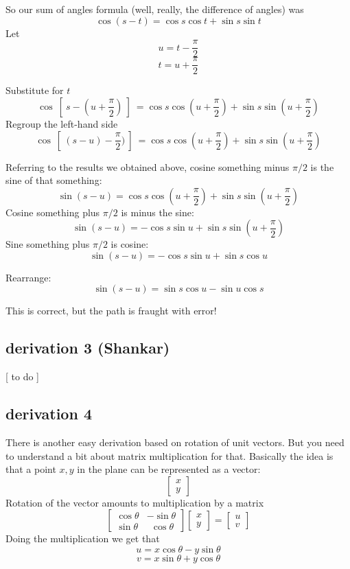 \documentclass[11pt, oneside]{article}
\begin{document}
So our sum of angles formula (well, really, the difference of angles) was
\[ \cos (s - t) = \cos s \cos t + \sin s \sin t \]
Let
\[ u = t - \frac{\pi}{2} \]
\[ t  = u + \frac{\pi}{2} \]

Substitute for $t$
\[ \cos \ [ \ s - (u + \frac{\pi}{2}) \ ] \ = \cos s \cos (u + \frac{\pi}{2}) + \sin s \sin (u + \frac{\pi}{2}) \]
Regroup the left-hand side
\[ \cos \ [ \ (s - u) - \frac{\pi}{2}) \ ] \ = \cos s \cos (u + \frac{\pi}{2}) + \sin s \sin (u + \frac{\pi}{2}) \]

Referring to the results we obtained above, cosine something minus $\pi/2$ is the sine of that something:
\[ \sin (s - u) = \cos s \cos (u + \frac{\pi}{2}) + \sin s \sin (u + \frac{\pi}{2}) \]
Cosine something plus $\pi/2$ is minus the sine:
\[ \sin (s - u) = -\cos s \sin u + \sin s \sin (u + \frac{\pi}{2}) \]
Sine something plus $\pi/2$ is cosine:
\[ \sin (s - u) = -\cos s \sin u + \sin s \cos u \]

Rearrange:
\[ \sin (s - u) = \sin s \cos u - \sin u \cos s \]

This is correct, but the path is fraught with error!  

\subsection*{derivation 3 (Shankar)}
[ to do ]

\subsection*{derivation 4}
There is another easy derivation based on rotation of unit vectors.  But you need to understand a bit about matrix multiplication for that.  Basically the idea is that a point $x,y$ in the plane can be represented as a vector:
\[ 
\begin{bmatrix}
x \\
y
\end{bmatrix}
\]
Rotation of the vector amounts to multiplication by a matrix
\[
\begin{bmatrix}  
\cos \theta & -\sin \theta \\
\sin \theta & \ \  \cos \theta 
\end{bmatrix}
\begin{bmatrix}  x \\ y \end{bmatrix}
=
\begin{bmatrix}  u \\ v \end{bmatrix}
\]
Doing the multiplication we get that
\[ u = x \cos \theta - y \sin \theta \]
\[ v = x \sin \theta + y \cos \theta \]
\end{document}
